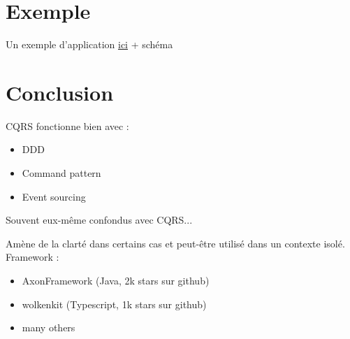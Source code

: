 \documentclass{beamer}
\begin{document}
  \section{Exemple}
  \begin{frame}
	Un exemple d'application \href{https://github.com/FrancisLfg/photographart}{ici} + schéma
  \end{frame}

  \section{Conclusion}
  \begin{frame}
  	CQRS fonctionne bien avec :
	\begin{itemize}
		\item DDD
		\item Command pattern
		\item Event sourcing
	\end{itemize}
	Souvent eux-même confondus avec CQRS...
   \end{frame}
   \begin{frame}
	Amène de la clarté dans certains cas et peut-être utilisé dans un contexte isolé.
	\\ Framework : 
	\begin{itemize}
		\item AxonFramework (Java, 2k stars sur github)
		\item wolkenkit (Typescript, 1k stars sur github)
		\item many others
	\end{itemize}
  \end{frame}
  
\end{document}
